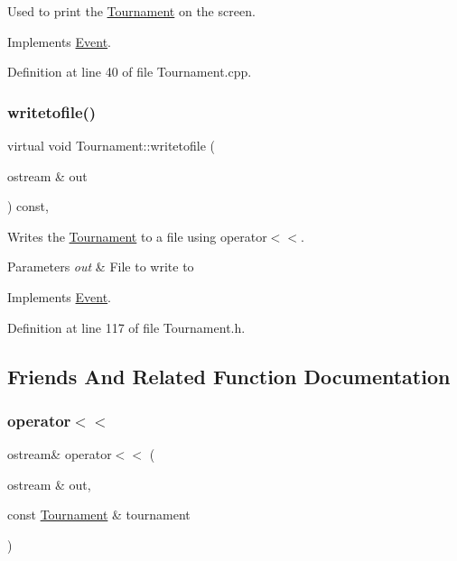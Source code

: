 Used to print the \hyperlink{class_tournament}{Tournament} on the screen. 



Implements \hyperlink{class_event_af53c2db83404a045087a271ed3c2604f}{Event}.



Definition at line 40 of file Tournament.\+cpp.

\hypertarget{class_tournament_a4aa375c287d890b9117a91058dcffb0c}{}\label{class_tournament_a4aa375c287d890b9117a91058dcffb0c} 
\subsubsection{\texorpdfstring{writetofile()}{writetofile()}}
{\footnotesize\ttfamily virtual void Tournament\+::writetofile (\begin{DoxyParamCaption}\item[{ostream \&}]{out }\end{DoxyParamCaption}) const\hspace{0.3cm}{\ttfamily [inline]}, {\ttfamily [virtual]}}



Writes the \hyperlink{class_tournament}{Tournament} to a file using operator$<$$<$. 


\begin{DoxyParams}{Parameters}
{\em out} & File to write to \\
\hline
\end{DoxyParams}


Implements \hyperlink{class_event_a0c263fb7398dc2f0969a2bb22b47a40a}{Event}.



Definition at line 117 of file Tournament.\+h.



\subsection{Friends And Related Function Documentation}
\hypertarget{class_tournament_a732b99f4a91ce76bb3db57cffd96f441}{}\label{class_tournament_a732b99f4a91ce76bb3db57cffd96f441} 
\subsubsection{\texorpdfstring{operator$<$$<$}{operator<<}}
{\footnotesize\ttfamily ostream\& operator$<$$<$ (\begin{DoxyParamCaption}\item[{ostream \&}]{out,  }\item[{const \hyperlink{class_tournament}{Tournament} \&}]{tournament }\end{DoxyParamCaption})\hspace{0.3cm}{\ttfamily [friend]}}



